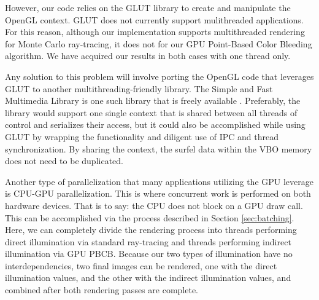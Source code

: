However, our code relies on the GLUT library \cite{bib:glut} to create and manipulate the OpenGL context. GLUT does not currently support mulithreaded applications. For this reason, although our implementation supports multithreaded rendering for Monte Carlo ray-tracing, it does not for our GPU Point-Based Color Bleeding algorithm. We have acquired our results in both cases with one thread only.
 
Any solution to this problem will involve porting the OpenGL code that leverages GLUT to another multithreading-friendly library. The Simple and Fast Multimedia Library is one such library that is freely available \cite{bib:sfml}. Preferably, the library would support one single context that is shared between all threads of control and serializes their access, but it could also be accomplished while using GLUT by wrapping the functionality and diligent use of IPC and thread synchronization. By sharing the context, the surfel data within the VBO memory does not need to be duplicated.

Another type of parallelization that many applications utilizing the GPU leverage is CPU-GPU parallelization. This is where concurrent work is performed on both hardware devices. That is to say: the CPU does not block on a GPU draw call. This can be accomplished via the process described in Section \ref{sec:batching}. Here, we can completely divide the rendering process into threads performing direct illumination via standard ray-tracing and threads performing indirect illumination via GPU PBCB. Because our two types of illumination have no interdependencies, two final images can be rendered, one with the direct illumination values, and the other with the indirect illumination values, and combined after both rendering passes are complete.

